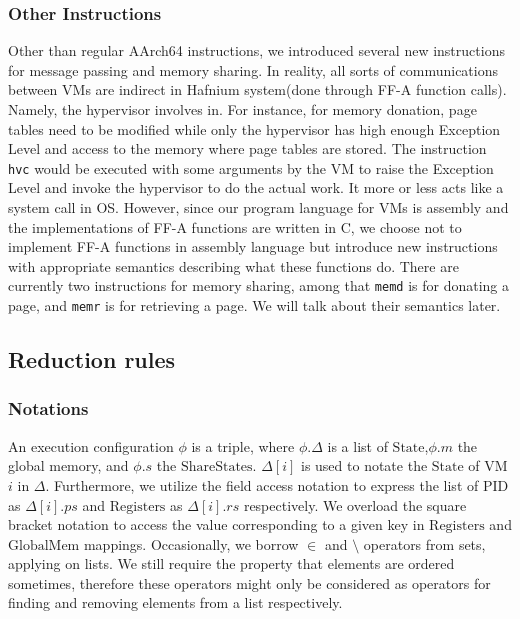 \documentclass[a4paper]{article}
\newcommand*{\STATE}{\text{State}}
\newcommand*{\MEM}{\text{GlobalMem}}
\newcommand*{\SSS}{\text{ShareStates}}
\newcommand*{\PID}{\text{PID}}
\newcommand*{\REGS}{\text{Registers}}
\begin{document}
\subsubsection{Other Instructions}
Other than regular AArch64 instructions, we introduced several new instructions
for message passing and memory sharing. In reality, all sorts of communications
between VMs are indirect in Hafnium system(done through FF-A function calls).
Namely, the hypervisor involves in. For instance, for memory donation, page
tables need to be modified while only the hypervisor has high enough Exception
Level and access to the memory where page tables are stored. The instruction
\texttt{hvc} would be executed with some arguments by the VM to raise the
Exception Level and invoke the hypervisor to do the actual work. It more or less
acts like a system call in OS. However, since our program language for VMs is
assembly and the implementations of FF-A functions are written in C, we choose
not to implement FF-A functions in assembly language but introduce new
instructions with appropriate semantics describing what these functions do.
There are currently two instructions for memory sharing, among that
\texttt{memd} is for donating a page, and \texttt{memr} is for retrieving a
page. We will talk about their semantics later.




\subsection{Reduction rules}
\subsubsection{Notations}
An execution configuration $\phi$ is a triple, where $\phi.\Delta$
is a list of $\STATE$,$\phi.m$ the global memory, and $\phi.s$ the $\SSS$. $\Delta[i]$ is used
to notate the $\STATE$ of VM $i$ in $\Delta$. Furthermore, we utilize the field
access notation to express the list of $\PID$ as $\Delta[i].ps$ and $\REGS$ as
$\Delta[i].rs$ respectively. We overload the square bracket notation to access
the value corresponding to a given key in $\REGS$ and $\MEM$ mappings. Occasionally, we
borrow $\in$ and $\setminus$ operators from sets, applying on lists. We still require
the property that elements are ordered sometimes, therefore these
operators might only be considered as operators for finding
and removing elements from a list respectively.
\end{document}
